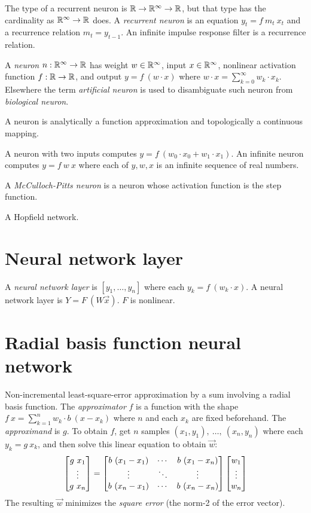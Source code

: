 The type of a recurrent neuron is \(\mathbb{R} \to \mathbb{R}^\infty \to \mathbb{R}\),
but that type has the cardinality as \(\mathbb{R}^\infty \to \mathbb{R}\) does.
A \emph{recurrent neuron} is an equation \(y_t = f~m_t~x_t\)
and a recurrence relation \(m_t = y_{t-1}\).
An infinite impulse response filter is a recurrence relation.

A \emph{neuron} \(n : \mathbb{R}^\infty \to \mathbb{R}\)
has weight \(w \in \mathbb{R}^\infty\), input \(x \in \mathbb{R}^\infty\),
nonlinear activation function \(f : \mathbb{R} \to \mathbb{R}\),
and output \(y = f~(w \cdot x)\) where \(w \cdot x = \sum_{k=0}^\infty w_k \cdot x_k\).
Elsewhere the term \emph{artificial neuron} is used to disambiguate
such neuron from \emph{biological neuron}.

A neuron is analytically a function approximation
and topologically a continuous mapping.

A neuron with two inputs computes \(y = f~(w_0 \cdot x_0 + w_1 \cdot x_1)\).
An infinite neuron computes \(y = f~w~x\)
where each of \(y,w,x\) is an infinite sequence of real numbers.

%
%
A \emph{McCulloch-Pitts neuron} is a neuron whose activation function is the step function.

A Hopfield network.

\section{Neural network layer}

A \emph{neural network layer} is
\([y_1,\ldots,y_n]\) where each \(y_k = f~(w_k \cdot x) \).
A neural network layer is
\(Y = F~(W \vec{x}) \).
\(F\) is nonlinear.

\section{Radial basis function neural network}

Non-incremental least-square-error approximation by a sum involving a radial basis function.
The \emph{approximator} \(f\) is a function with the shape \(f~x = \sum_{k=1}^n w_k \cdot b~(x-x_k)\)
where \(n\) and each \(x_k\) are fixed beforehand.
The \emph{approximand} is \(g\).
To obtain \(f\),
get \(n\) samples \((x_1,y_1), ~ \ldots , ~ (x_n,y_n)\) where each \(y_k = g~x_k\),
and then
solve this linear equation to obtain \(\vec{w}\):
\begin{align}
    \begin{bmatrix}g~x_1 \\ \vdots \\ g~x_n\end{bmatrix} = \begin{bmatrix}b~(x_1-x_1) & \cdots & b~(x_1-x_n) \\ \vdots & \ddots & \vdots \\ b~(x_n-x_1) & \cdots & b~(x_n-x_n)\end{bmatrix} \begin{bmatrix}w_1 \\ \vdots \\ w_n\end{bmatrix}
\end{align}
The resulting \(\vec{w}\) minimizes the
\emph{square error} (the norm-2 of the error vector).

